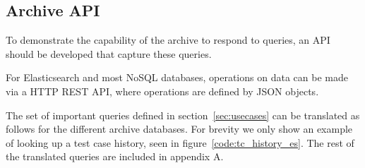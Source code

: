 \subsection{Archive API}
\label{sec:archiveapi}
To demonstrate the capability of the archive to respond to queries, an API should be developed that capture these queries. 

For Elasticsearch and most NoSQL databases, operations on data can be made via a HTTP REST API, where operations are defined by JSON objects.

The set of important queries defined in section~\ref{sec:usecases} can be translated as follows for the different archive databases. For brevity we only show an example of looking up a test case history, seen in figure~\ref{code:tc_history_es}. The rest of the translated queries are included in appendix A.

%
%
%
%
%
%
%


